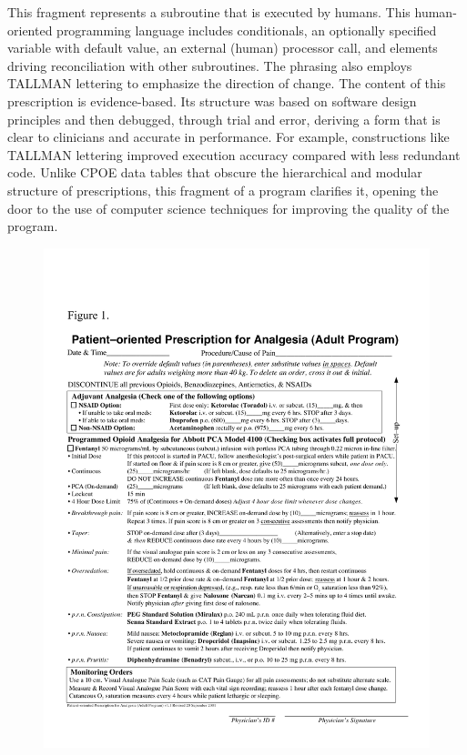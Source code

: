 \noindent
This fragment represents a subroutine that is executed by humans. This
human-oriented programming language 
includes conditionals, an optionally specified
variable with default value, an external (human) processor call, and
elements driving reconciliation with other subroutines. The phrasing
also employs TALLMAN lettering to emphasize the direction of
change. The content of this prescription is
evidence-based. Its structure was based on software design principles
and then debugged, through trial and error, deriving a form that is
clear to clinicians and accurate in performance. For example, 
constructions like TALLMAN lettering improved execution accuracy compared with
less redundant code. Unlike CPOE data tables
that obscure the hierarchical and modular structure of prescriptions,
this fragment of a \poppl{} program clarifies it, opening the door to 
the use of computer science techniques for improving the quality of
the program.

\begin{figure}
\includegraphics[scale=.8]{fig1.pdf}
\captionsetup{labelformat=empty}
\caption{}\label{fig:popa}
\end{figure}

